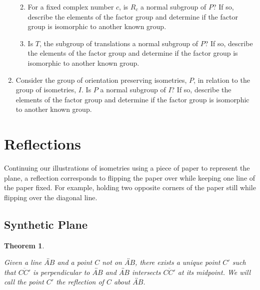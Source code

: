 \documentclass[
]{book}
\providecommand{\tightlist}{%
  \setlength{\itemsep}{0pt}\setlength{\parskip}{0pt}}
\newtheorem{theorem}{Theorem}[chapter]
\theoremstyle{definition}
\theoremstyle{definition}
\theoremstyle{definition}
\theoremstyle{definition}
\theoremstyle{remark}
\begin{document}
\begin{enumerate}
  \begin{enumerate}
  \def\labelenumii{\alph{enumii}.}
  \tightlist
  \item
    For a fixed complex number \(c\), is \(R_c\) a normal subgroup of \(P\)? If so, describe the elements of the factor group and determine if the factor group is isomorphic to another known group.
  \item
    Is \(T\), the subgroup of translations a normal subgroup of \(P\)? If so, describe the elements of the factor group and determine if the factor group is isomorphic to another known group.
  \end{enumerate}
\item
  Consider the group of orientation preserving isometries, \(P\), in relation to the group of isometries, \(I\). Is \(P\) a normal subgroup of \(I\)? If so, describe the elements of the factor group and determine if the factor group is isomorphic to another known group.
\end{enumerate}

\hypertarget{reflections-1}{%
\section{Reflections}\label{reflections-1}}

Continuing our illustrations of isometries using a piece of paper to represent the plane, a reflection corresponds to flipping the paper over while keeping one line of the paper fixed. For example, holding two opposite corners of the paper still while flipping over the diagonal line.

\hypertarget{synthetic-plane-3}{%
\subsection{Synthetic Plane}\label{synthetic-plane-3}}

\begin{theorem}
\protect\hypertarget{thm:unlabeled-div-274}{}\label{thm:unlabeled-div-274}

Given a line \(\overleftrightarrow{AB}\) and a point \(C\) not on \(\overleftrightarrow{AB}\), there exists a unique point \(C'\) such that \(\overline{CC'}\) is perpendicular to \(\overleftrightarrow{AB}\) and \(\overleftrightarrow{AB}\) intersects \(\overline{CC'}\) at its midpoint. We will call the point \(C'\) the reflection of \(C\) about \(\overleftrightarrow{AB}\).

\end{theorem}
\end{document}
